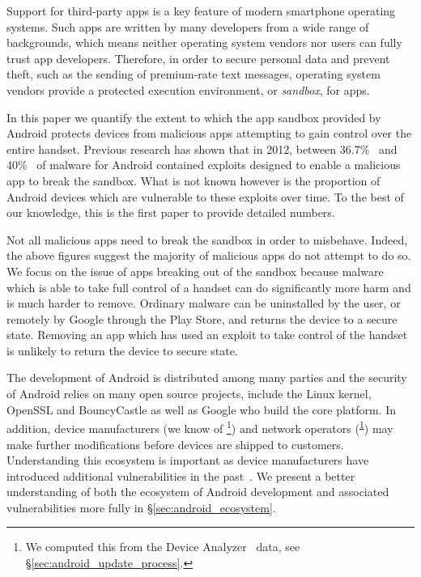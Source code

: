\documentclass[conference,a4paper,twoside]{IEEEtran}
\newcommand{\da}{Device Analyzer}
\newcommand{\dafoot}{\textsuperscript{\ref{foot:dadata}}}
\newcommand{\percMarketShare}{83.6\%~\footnote{\url{http://www.theinquirer.net/inquirer/news/2379036/android-hits-836-percent-marketshare-while-ios-windows-and-blackberry-slide}}}
\begin{document}
Support for third-party apps is a key feature of modern smartphone operating systems.
Such apps are written by many developers from a wide range of backgrounds, which means neither operating system vendors nor users can fully trust app developers.
Therefore, in order to secure personal data and prevent theft, such as the sending of premium-rate text messages, operating system vendors provide a protected execution environment, or \emph{sandbox}, for apps.

In this paper we quantify the extent to which the app sandbox provided by Android protects devices from malicious apps attempting to gain control over the entire handset.
Previous research has shown that in 2012, between 36.7\%~\cite{Zhou2012b} and 40\%~\cite{Zhou2012a} of malware for Android contained exploits designed to enable a malicious app to break the sandbox.
What is not known however is the proportion of Android devices which are vulnerable to these exploits over time.
To the best of our knowledge, this is the first paper to provide detailed numbers.

Not all malicious apps need to break the sandbox in order to misbehave.
Indeed, the above figures suggest the majority of malicious apps do not attempt to do so.
We focus on the issue of apps breaking out of the sandbox because malware which is able to take full control of a handset can do significantly more harm and is much harder to remove.
Ordinary malware can be uninstalled by the user, or remotely by Google through the Play Store, and returns the device to a secure state. 
Removing an app which has used an exploit to take control of the handset is unlikely to return the device to secure state.

The development of Android is distributed among many parties and the security of Android relies on many open source projects, include the Linux kernel, OpenSSL and BouncyCastle as well as Google who build the core platform. 
In addition, device manufacturers (we know of \daNumManufacturers\footnote{\label{foot:dadata}We computed this from the \da~\cite{Wagner2013} data, see \S\ref{sec:android_update_process}.}) and network operators (\daNumOperators\dafoot) may make further modifications before devices are shipped to customers. 
Understanding this ecosystem is important as device manufacturers have introduced additional vulnerabilities in the past~\cite{Grace2012}. 
We present a better understanding of both the ecosystem of Android development and associated vulnerabilities more fully in \S\ref{sec:android_ecosystem}.
 
\end{document}
